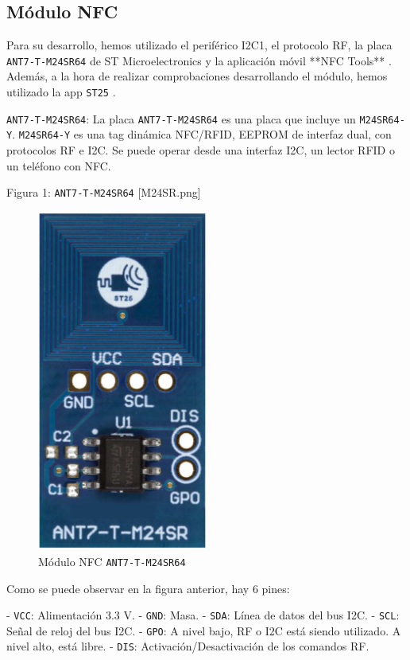 \subsection{Módulo NFC}

Para su desarrollo, hemos utilizado el periférico I2C1, el protocolo RF, la placa \texttt{ANT7-T-M24SR64} \cite{M24SR64YPagWeb} de ST Microelectronics y la aplicación móvil **NFC Tools** \cite{NFCTools}. Además, a la hora de realizar comprobaciones desarrollando el módulo, hemos utilizado la app \texttt{ST25} \cite{ST25}.

\texttt{ANT7-T-M24SR64}: 
La placa \texttt{ANT7-T-M24SR64} es una placa que incluye un \texttt{M24SR64-Y}. \texttt{M24SR64-Y} es una tag dinámica NFC/RFID, EEPROM de interfaz dual, con protocolos RF e I2C. Se puede operar desde una interfaz I2C, un lector RFID o un teléfono con NFC.

Figura 1: \texttt{ANT7-T-M24SR64} [M24SR.png]
\begin{figure}[h]
    \centering
    \includegraphics[width=0.5\textwidth]{images/2/2-5/M24SR.png}
    \caption{Módulo NFC \texttt{ANT7-T-M24SR64}}
    \label{fig:2-5-modulo-nfc}
\end{figure}

Como se puede observar en la figura anterior, hay 6 pines:

- \texttt{VCC}: Alimentación 3.3 V.
- \texttt{GND}: Masa.
- \texttt{SDA}: Línea de datos del bus I2C.
- \texttt{SCL}: Señal de reloj del bus I2C.
- \texttt{GPO}: A nivel bajo, RF o I2C está siendo utilizado. A nivel alto, está libre.
- \texttt{DIS}: Activación/Desactivación de los comandos RF.
